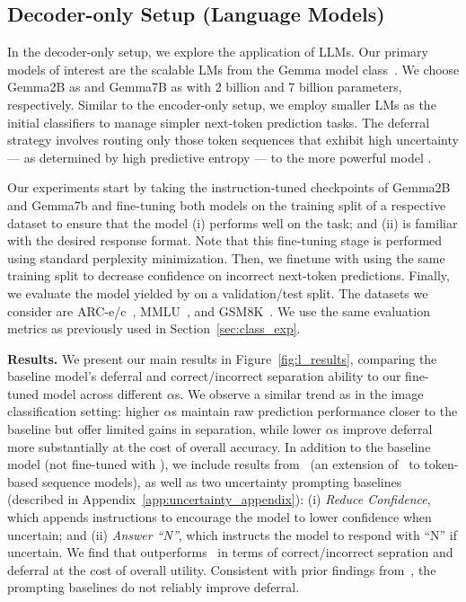 \subsection{Decoder-only Setup (Language Models)}
\label{sec:lang_exp}

In the decoder-only setup, we explore the application of LLMs. Our primary models of interest are the scalable LMs from the Gemma model class~\citep{team2024gemma}. We choose Gemma2B as \smallmodel and Gemma7B as \bigmodel with 2 billion and 7 billion parameters, respectively. Similar to the encoder-only setup, we employ smaller LMs as the initial classifiers to manage simpler next-token prediction tasks. The deferral strategy involves routing only those token sequences that exhibit high uncertainty --- as determined by high predictive entropy --- to the more powerful model \bigmodel.

Our experiments start by taking the instruction-tuned checkpoints of Gemma2B and Gemma7b and fine-tuning both models on the training split of a respective dataset to ensure that the model (i) performs well on the task; and (ii) is familiar with the desired response format. Note that this fine-tuning stage is performed using standard perplexity minimization. Then, we finetune \smallmodel with \loss using the same training split to decrease confidence on incorrect next-token predictions. Finally, we evaluate the model yielded by \loss on a validation/test split. The datasets we consider are ARC-e/c~\citep{clark2018think}, MMLU~\citep{hendrycks2020measuring}, and GSM8K~\citep{cobbe2021training}. We use the same evaluation metrics as previously used in Section~\ref{sec:class_exp}.

\textbf{Results.} We present our main results in Figure~\ref{fig:l_results}, comparing the baseline model’s deferral and correct/incorrect separation ability to our fine-tuned model across different $\alpha$s. We observe a similar trend as in the image classification setting: higher $\alpha$s maintain raw prediction performance closer to the baseline but offer limited gains in separation, while lower $\alpha$s improve deferral more substantially at the cost of overall accuracy. In addition to the baseline model (not fine-tuned with \loss), we include results from~\citet{gupta2024languagemodelcascadestokenlevel} (an extension of~\citet{NEURIPS2022_bc8f76d9} to token-based sequence models), as well as two uncertainty prompting baselines (described in Appendix~\ref{app:uncertainty_appendix}): (i) \emph{Reduce Confidence}, which appends instructions to encourage the model to lower confidence when uncertain; and (ii) \emph{Answer ``N''}, which instructs the model to respond with ``N'' if uncertain. We find that \loss outperforms~\citet{gupta2024languagemodelcascadestokenlevel} in terms of correct/incorrect sepration and deferral at the cost of overall utility. Consistent with prior findings from~\citet{kadavath2022language}, the prompting baselines do not reliably improve deferral.

